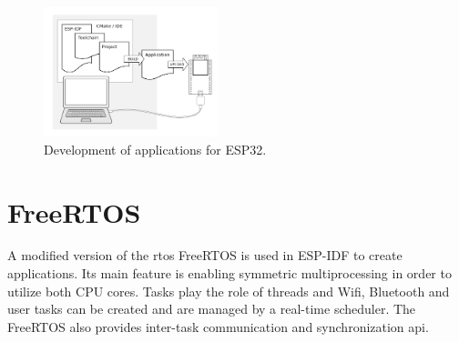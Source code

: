 \begin{figure}[h!]
    \centering
    \captionsetup{justification=centering,margin=0.5cm}
    \includegraphics[width=0.45\textwidth]{images/upload_process.png}
    \caption[Development of applications for ESP32]{Development of applications for ESP32.~\cite{espidf2022}}
    \label{fig:upload_process}
\end{figure}

\section{FreeRTOS}

A modified version of the \gls{rtos} FreeRTOS is used in ESP-IDF to create applications. Its main feature is enabling symmetric multiprocessing in order to utilize both CPU cores. Tasks play the role of threads and Wifi, Bluetooth and user tasks can be created and are managed by a real-time scheduler. The FreeRTOS also provides inter-task communication and synchronization \gls{api}.~\cite{espidf2022}
